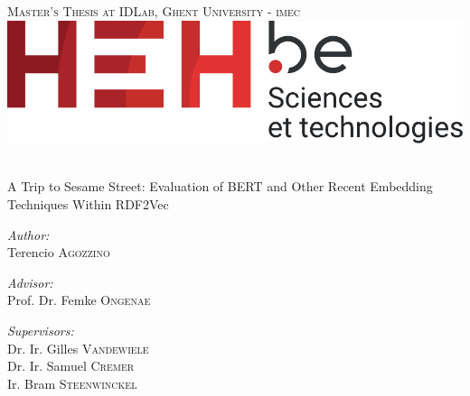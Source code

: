 \begin{titlepage}
  \begin{center}

    \textsc{\Large Master's Thesis at IDLab, Ghent University - imec}\\[1cm]

    \includegraphics[width=.5\linewidth]{img/logo/heh-technical}\\[1cm]

    \begin{vc}
      \begingroup
      \HRule\\
      \flushleft
      \Huge A Trip to Sesame Street: Evaluation of BERT and Other Recent Embedding Techniques Within RDF2Vec
      \HRule\\
      \endgroup
    \end{vc}

    \begin{minipage}[t]{0.4\textwidth}
      \begin{flushleft} \large
        \emph{Author:}\\
        \hspace{0.1em}
        Terencio \textsc{Agozzino}
      \end{flushleft}
    \end{minipage}
    \hspace{5em}
    \begin{minipage}[t]{0.4\textwidth}
      \begin{flushleft} \large
        \emph{Advisor:}\\
        \hspace{0.1em}
        Prof. Dr. Femke \textsc{Ongenae}
      \end{flushleft}
      \begin{flushleft} \large
        \emph{Supervisors:}\\
        \hspace{0.1em}
        Dr. Ir. Gilles \textsc{Vandewiele}\\
        \hspace{0.1em}
        Dr. Ir. Samuel \textsc{Cremer}\\
        \hspace{0.1em}
        Ir. Bram \textsc{Steenwinckel}
      \end{flushleft}
    \end{minipage}\\[1cm]


\end{center}
\end{titlepage}
